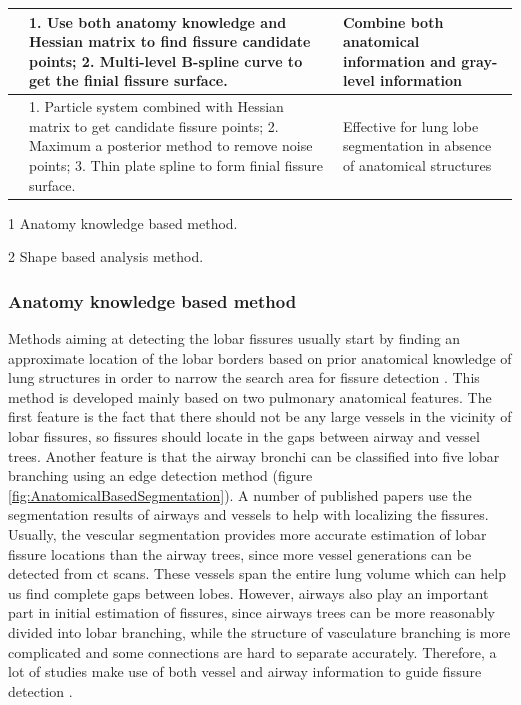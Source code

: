 \begin{table}[htbp]
\begin{threeparttable}
\begin{tabular}{|p{4.3cm}|p{6.3cm}|p{4.8cm}|}
\hline
\cite{doel2012pulmonary} & 1. Use both anatomy knowledge and Hessian matrix to find fissure candidate points; 2. Multi-level B-spline curve to get the finial fissure surface. & Combine both anatomical information and gray-level information\tnote{1,2}\\
\hline
\cite{ross2010automatic,ross2013pulmonary} & 1. Particle system combined with Hessian matrix to get candidate fissure points; 2. Maximum a posterior method to remove noise points; 3. Thin plate spline to form finial fissure surface. & Effective for lung lobe segmentation in absence of anatomical structures\tnote{2}\\
\hline
\end{tabular}
\begin{tablenotes}
        \footnotesize
        \item[1] Anatomy knowledge based method.
        \item[2] Shape based analysis method.
\end{tablenotes}
\end{threeparttable}
\end{table}

\subsubsection{Anatomy knowledge based method}
Methods aiming at detecting the lobar fissures usually start by finding an approximate location of the lobar borders based on prior anatomical knowledge of lung structures in order to narrow the search area for fissure detection \citep{kuhnigk2003lung,kuhnigk2005informatics,zhou2004automatic,saita2006algorithm,zhang2006atlas,ukil2009anatomy,pu2009computational,lassen2010automatic,doel2012pulmonary}. This method is developed mainly based on two pulmonary anatomical features. The first feature is the fact that there should not be any large vessels in the vicinity of lobar fissures, so fissures should locate in the gaps between airway and vessel trees. Another feature is that the airway bronchi can be classified into five lobar branching using an edge detection method (figure \ref{fig:AnatomicalBasedSegmentation}). A number of published papers use the segmentation results of airways and vessels to help with localizing the fissures. Usually, the vescular segmentation provides more accurate estimation of lobar fissure locations than the airway trees, since more vessel generations can be detected from \gls{ct} scans. These vessels span the entire lung volume which can help us find complete gaps between lobes. However, airways also play an important part in initial estimation of fissures, since airways trees can be more reasonably divided into lobar branching, while the structure of vasculature branching is more complicated and some connections are hard to separate accurately. Therefore, a lot of studies make use of both vessel and airway information to guide fissure detection \citep{ukil2009anatomy,lassen2010automatic,doel2012pulmonary}.

